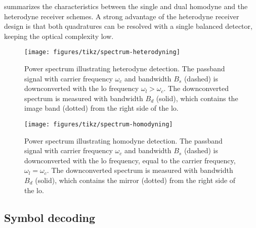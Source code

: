  summarizes the characteristics between the single and dual homodyne and the heterodyne receiver schemes.
A strong advantage of the heterodyne receiver design is that both quadratures can be resolved with a single balanced detector, keeping the optical complexity low.
\begin{figure}[htb]
	\centering
	\texttt{[image: figures/tikz/spectrum-heterodyning]}
	\caption{Power spectrum illustrating heterodyne detection. The passband signal with carrier frequency $\omega_c$ and bandwidth $B_s$ (dashed) is downconverted with the \gls{lo} frequency $\omega_l>\omega_c$. The downconverted spectrum is measured with bandwidth $B_d$ (solid), which contains the image band (dotted) from the right side of the \gls{lo}.}\label{fig:spectrum_heterodyning}
\end{figure}
\begin{figure}[htb]
	\centering
	\texttt{[image: figures/tikz/spectrum-homodyning]}
	\caption{Power spectrum illustrating homodyne detection. The passband signal with carrier frequency $\omega_c$ and bandwidth $B_s$ (dashed) is downconverted with the \gls{lo} frequency, equal to the carrier frequency, $\omega_l=\omega_c$. The downconverted spectrum is measured with bandwidth $B_d$ (solid), which contains the mirror (dotted) from the right side of the \gls{lo}.}\label{fig:spectrum_homodyning}
\end{figure}

\FloatBarrier
\subsection{Symbol decoding}

